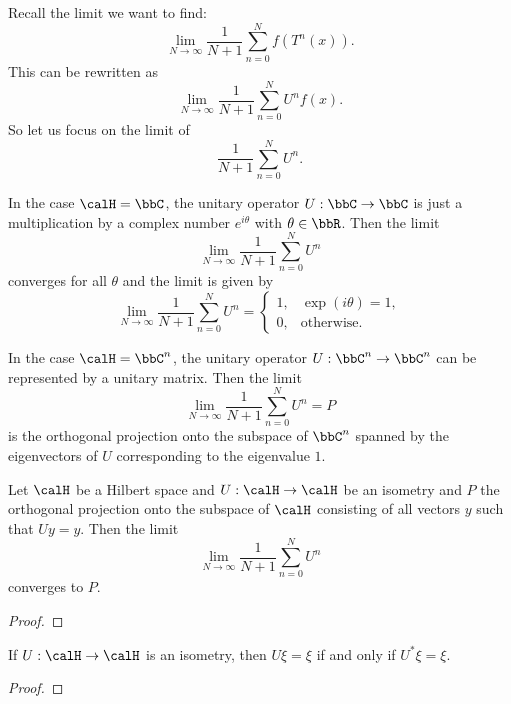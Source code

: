     Recall the limit we want to find:
    \[ \lim_{N \to \infty} \frac{1}{N+1} \sum_{n=0}^{N} f(T^n(x)). \]
    This can be rewritten as
    \[ \lim_{N \to \infty} \frac{1}{N+1} \sum_{n=0}^{N} U^n f(x). \]
    So let us focus on the limit of
    \[ \frac{1}{N+1} \sum_{n=0}^{N} U^n. \]

    In the case \(\calH = \bbC\), the unitary operator \(U: \bbC \to \bbC\) is just a multiplication by a complex number \(e^{i\theta}\) with \(\theta \in \bbR\).
    Then the limit
    \[ \lim_{N \to \infty} \frac{1}{N+1} \sum_{n=0}^{N} U^n \]
    converges for all \(\theta\) and the limit is given by
    \[ \lim_{N \to \infty} \frac{1}{N+1} \sum_{n=0}^{N} U^n = \begin{cases}
        1, & \exp(i\theta) = 1, \\
        0, & \text{otherwise}.
    \end{cases} \]

    In the case \(\calH = \bbC^n\), the unitary operator \(U: \bbC^n \to \bbC^n\) can be represented by a unitary matrix.
    Then the limit
    \[ \lim_{N \to \infty} \frac{1}{N+1} \sum_{n=0}^{N} U^n = P\]
    is the orthogonal projection onto the subspace of \(\bbC^n\) spanned by the eigenvectors of \(U\) corresponding to the eigenvalue \(1\).

    \begin{theorem}\label{thm:von_neumann_mean_ergodic_theorem}
        Let \(\calH\) be a Hilbert space and \(U: \calH \to \calH\) be an isometry and \(P\) the orthogonal projection onto the subspace of \(\calH\) consisting of all vectors \(y\) such that \(U y = y\).
        Then the limit
        \[ \lim_{N \to \infty} \frac{1}{N+1} \sum_{n=0}^{N} U^n\]
        converges to \(P\).
    \end{theorem}
    \begin{proof}
    \end{proof}

    \begin{lemma}\label{lem:U_xi_equals_xi_iff_U_star_xi_equals_xi}
        If \(U: \calH \to \calH\) is an isometry, then \(U \xi = \xi\) if and only if \(U^* \xi = \xi\).
    \end{lemma}
    \begin{proof}
    \end{proof}